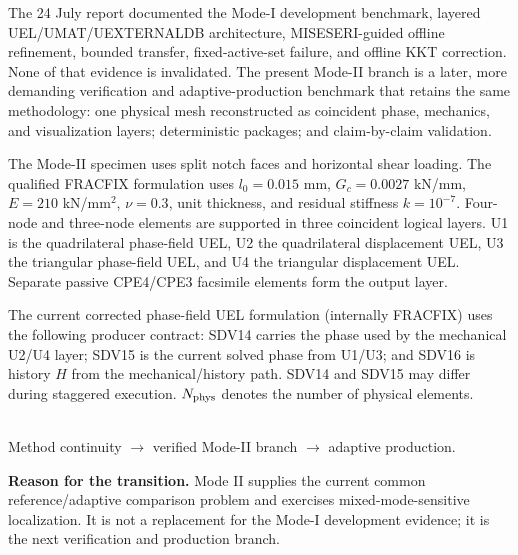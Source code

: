 \documentclass[11pt,a4paper]{article}
\newcommand{\boxx}[2]{\colorbox{#1}{\parbox{\dimexpr\linewidth-2\fboxsep}{#2}}}
\newcommand{\headx}[1]{{\color{navy}\fontsize{17}{20}\selectfont\bfseries #1}\par\vspace{1.5mm}{\color{blue}\rule{\linewidth}{1.1pt}}\vspace{3mm}}
\newcommand{\captionfont}{\fontsize{9.5}{11.5}\selectfont}
\begin{document}
\clearpage\headx{1. From Mode I development to Mode II verification}
The 24 July report documented the Mode-I development benchmark, layered UEL/UMAT/UEXTERNALDB architecture, MISESERI-guided offline refinement, bounded transfer, fixed-active-set failure, and offline KKT correction. None of that evidence is invalidated. The present Mode-II branch is a later, more demanding verification and adaptive-production benchmark that retains the same methodology: one physical mesh reconstructed as coincident phase, mechanics, and visualization layers; deterministic packages; and claim-by-claim validation.

The Mode-II specimen uses split notch faces and horizontal shear loading. The qualified FRACFIX formulation uses $l_0=0.015$ mm, $G_c=0.0027$ kN/mm, $E=210$ kN/mm$^2$, $\nu=0.3$, unit thickness, and residual stiffness $k=10^{-7}$. Four-node and three-node elements are supported in three coincident logical layers. U1 is the quadrilateral phase-field UEL, U2 the quadrilateral displacement UEL, U3 the triangular phase-field UEL, and U4 the triangular displacement UEL. Separate passive CPE4/CPE3 facsimile elements form the output layer.

The current corrected phase-field UEL formulation (internally FRACFIX) uses the following producer contract: SDV14 carries the phase used by the mechanical U2/U4 layer; SDV15 is the current solved phase from U1/U3; and SDV16 is history $H$ from the mechanical/history path. SDV14 and SDV15 may differ during staggered execution. $N_{\rm phys}$ denotes the number of physical elements.

\begin{center}
\\[1mm]\captionfont Method continuity $\rightarrow$ verified Mode-II branch $\rightarrow$ adaptive production.
\end{center}
\boxx{pa}{\textbf{Reason for the transition.} Mode II supplies the current common reference/adaptive comparison problem and exercises mixed-mode-sensitive localization. It is not a replacement for the Mode-I development evidence; it is the next verification and production branch.}
\end{document}
